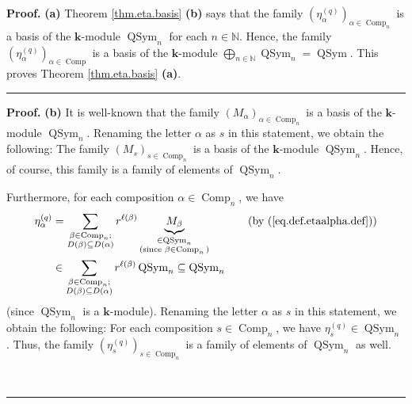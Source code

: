 \documentclass[numbers=enddot,12pt,final,onecolumn,notitlepage]{scrartcl}%
\theoremstyle{definition}
\newenvironment{proof}[1][Proof]{\noindent\textbf{#1.} }{\ \rule{0.5em}{0.5em}}
\let\sumnonlimits\sum
\let\oplusnonlimits\bigoplus
\renewcommand{\sum}{\sumnonlimits\limits}
\renewcommand{\bigoplus}{\oplusnonlimits\limits}
\newenvironment{verlong}{}{}
\newenvironment{vershort}{}{}
\begin{document}
\begin{vershort}
\begin{proof}
\textbf{(a)} Theorem \ref{thm.eta.basis} \textbf{(b)} says that the family
$\left(  \eta_{\alpha}^{\left(  q\right)  }\right)  _{\alpha\in
\operatorname*{Comp}\nolimits_{n}}$ is a basis of the $\mathbf{k}$-module
$\operatorname*{QSym}\nolimits_{n}$ for each $n\in\mathbb{N}$. Hence, the
family $\left(  \eta_{\alpha}^{\left(  q\right)  }\right)  _{\alpha
\in\operatorname*{Comp}}$ is a basis of the $\mathbf{k}$-module $\bigoplus
_{n\in\mathbb{N}}\operatorname*{QSym}\nolimits_{n}=\operatorname*{QSym}$. This
proves Theorem \ref{thm.eta.basis} \textbf{(a)}.
\end{proof}
\end{vershort}

\begin{verlong}


\begin{proof}
\textbf{(b)} It is well-known that the family $\left(  M_{\alpha}\right)
_{\alpha\in\operatorname*{Comp}\nolimits_{n}}$ is a basis of the $\mathbf{k}%
$-module $\operatorname*{QSym}\nolimits_{n}$. Renaming the letter $\alpha$ as
$s$ in this statement, we obtain the following: The family $\left(
M_{s}\right)  _{s\in\operatorname*{Comp}\nolimits_{n}}$ is a basis of the
$\mathbf{k}$-module $\operatorname*{QSym}\nolimits_{n}$. Hence, of course,
this family is a family of elements of $\operatorname*{QSym}\nolimits_{n}$.

Furthermore, for each composition $\alpha\in\operatorname*{Comp}\nolimits_{n}%
$, we have%
\begin{align*}
\eta_{\alpha}^{\left(  q\right)  }  &  =\sum_{\substack{\beta\in
\operatorname*{Comp}\nolimits_{n};\\D\left(  \beta\right)  \subseteq D\left(
\alpha\right)  }}r^{\ell\left(  \beta\right)  }\underbrace{M_{\beta}%
}_{\substack{\in\operatorname*{QSym}\nolimits_{n}\\\text{(since }\beta
\in\operatorname*{Comp}\nolimits_{n}\text{)}}}\ \ \ \ \ \ \ \ \ \ \left(
\text{by (\ref{eq.def.etaalpha.def})}\right) \\
&  \in\sum_{\substack{\beta\in\operatorname*{Comp}\nolimits_{n};\\D\left(
\beta\right)  \subseteq D\left(  \alpha\right)  }}r^{\ell\left(  \beta\right)
}\operatorname*{QSym}\nolimits_{n}\subseteq\operatorname*{QSym}\nolimits_{n}%
\end{align*}
(since $\operatorname*{QSym}\nolimits_{n}$ is a $\mathbf{k}$-module). Renaming
the letter $\alpha$ as $s$ in this statement, we obtain the following: For
each composition $s\in\operatorname*{Comp}\nolimits_{n}$, we have $\eta
_{s}^{\left(  q\right)  }\in\operatorname*{QSym}\nolimits_{n}$. Thus, the
family $\left(  \eta_{s}^{\left(  q\right)  }\right)  _{s\in
\operatorname*{Comp}\nolimits_{n}}$ is a family of elements of
$\operatorname*{QSym}\nolimits_{n}$ as well.


\end{proof}
\end{verlong}
\end{document}
